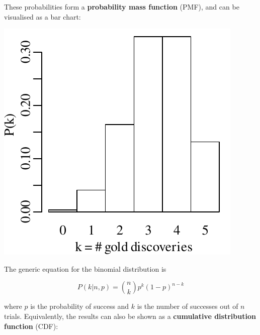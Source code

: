 These probabilities form a \textbf{probability mass function} (PMF),
and can be visualised as a bar chart:

\noindent\begin{minipage}[t][][b]{.3\textwidth}
  \includegraphics[width=\textwidth]{../figures/goldbarplot.pdf}
\end{minipage}
\begin{minipage}[t][][t]{.7\textwidth}
  \label{fig:goldbar}
\end{minipage}

The generic equation for the binomial distribution is

\begin{equation}
  P(k|n,p) = \binom{n}{k} p^k (1-p)^{n-k}
  \label{eq:binom}
\end{equation}

\noindent where $p$ is the probability of success and $k$ is the
number of successes out of $n$ trials. Equivalently, the results can
also be shown as a \textbf{cumulative distribution function} (CDF):

